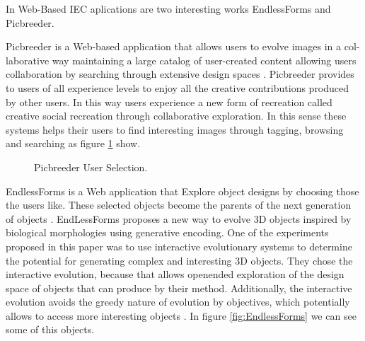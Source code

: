 In Web-Based IEC aplications are two interesting works EndlessForms and Picbreeder.

Picbreeder is a Web-based application that allows users to evolve images in a
col-laborative way maintaining a large catalog of user-created content allowing
users collaboration by searching through extensive design spaces
\cite{secretan2008picbreeder}. Picbreeder provides to users of all
experience levels to enjoy all the creative contributions produced by other
users. In this way users experience a new form of recreation called creative
social recreation through collaborative exploration. In this sense these systems
helps their users to find interesting images through tagging, browsing and
searching as figure  \ref{fig:Picbreeder} show.

\begin{figure}
\captionsetup{justification=centering,margin=2cm}
\centering
\setlength\fboxsep{0pt}
\setlength\fboxrule{0.7pt}
\caption{Picbreeder User Selection.}
\label{fig:Picbreeder}       
\end{figure}

EndlessForms is a Web application that Explore object designs by choosing those
the users like. These selected objects become the parents of the next generation
of objects \cite{clune2011evolving}. EndLessForms proposes a new way to evolve
3D objects inspired by biological morphologies using generative encoding. One of
the experiments proposed in this paper was to use interactive evolutionary
systems to determine the potential for generating complex and interesting 3D
objects. They chose the interactive evolution, because that allows openended
exploration of the design space of objects that can produce by their method.
Additionally, the interactive evolution avoids the greedy nature of evolution by
objectives, which potentially allows to access more interesting objects
\cite{clune2011evolving}. In figure \ref{fig:EndlessForms} we can see some of
this objects.

